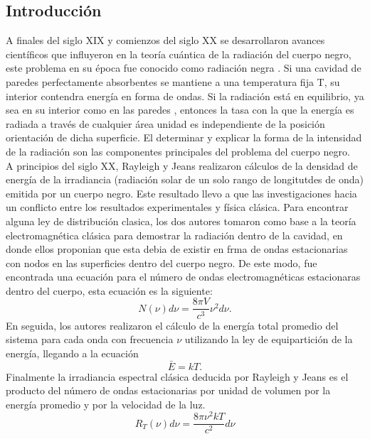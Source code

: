 \documentclass[12pt,letterpaper]{article}
\begin{document}
\begin{multicols}{2}
\section*{Introducción}
A finales del siglo XIX y comienzos del siglo XX se desarrollaron avances científicos que influyeron en la teoría cuántica de la radiación del cuerpo negro, este problema en su época fue conocido como radiación negra \cite{Planck1901}. Si una cavidad de paredes perfectamente absorbentes se mantiene a una temperatura fija T, su interior contendra energía en forma de ondas. Si la radiación está en equilibrio, ya sea en su interior como en las paredes
, entonces la tasa con la que la energía es radiada a través de cualquier área unidad es independiente de la posición  orientación de dicha superficie. El determinar y explicar la forma de la intensidad de la radiación son las componentes principales del problema del cuerpo negro. \\
A principios del siglo XX, Rayleigh \cite{LordRayleigh1900} y Jeans \cite{JHJeans1902} realizaron cálculos de la densidad de energía de la irradiancia (radiación solar de un solo rango de longitutdes de onda) emitida por un cuerpo negro. Este resultado llevo a que las investigaciones hacia un conflicto entre los resultados experimentales y física clásica. Para encontrar alguna ley de distribución clasica, los dos autores tomaron como base a la teoría electromagnética clásica para demostrar la radiación dentro de la cavidad, en donde ellos proponian que esta debia de existir en frma de ondas estacionarias con nodos en las superficies dentro del cuerpo negro. De este modo, fue encontrada 
una ecuación para el número de ondas electromagnéticas estacionaras dentro del cuerpo, esta ecuación es la siguiente: 
\begin{equation}
    N(\nu)d\nu = \frac{8\pi V}{c^3} \nu^2 d\nu.
    \label{N(nu)dnu}
\end{equation}
En seguida, los autores realizaron el cálculo de la energía total promedio del sistema para cada onda con frecuencia $\nu$ utilizando la ley de equipartición de la energía, llegando a la ecuación
\begin{equation}
    \bar{E}=kT.
\end{equation}
Finalmente la irradiancia espectral clásica deducida por Rayleigh y Jeans es el producto del número de ondas estacionarias por unidad de volumen por la energía promedio y por la velocidad de la luz.
\begin{equation}
    R_T(\nu)d\nu = \frac{8\pi \nu^2 kT}{c^2} d\nu 

\end{equation}
\end{multicols}
\end{document}
